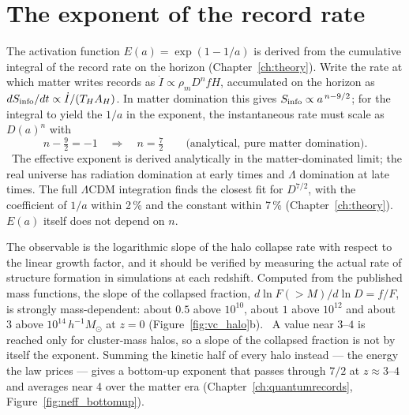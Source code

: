 \section{The exponent of the record rate}\label{sec:vc_exponent}
The activation function $E(a)=\exp(1-1/a)$ is derived from the cumulative integral of the record rate on the horizon (Chapter~\ref{ch:theory}). Write the
rate at which matter writes records as $\dot I\propto\rho_mD^nfH$, accumulated on the horizon as $dS_{\rm info}/dt\propto\dot I/(T_HA_H)$. In matter domination
this gives $S_{\rm info}\propto a^{\,n-9/2}$; for the integral to yield the $1/a$ in the exponent, the instantaneous rate must scale as $D(a)^n$ with
\begin{equation}
n-\tfrac92=-1\quad\Longrightarrow\quad n=\tfrac72\qquad\text{(analytical, pure matter domination).}\label{eq:vc_n}
\end{equation}
\derived\ The effective exponent is derived analytically in the matter-dominated limit; the real universe has radiation domination at early times and
$\Lambda$ domination at late times. The full $\Lambda$CDM integration finds the closest fit for $D^{7/2}$, with the coefficient of $1/a$ within 2\,\% and the constant within 7\,\% (Chapter~\ref{ch:theory}).
\calc\ $E(a)$ itself does not depend on $n$.

The observable is the logarithmic slope of the halo collapse rate with respect to the linear growth factor, and it should be verified by measuring the
actual rate of structure formation in simulations at each redshift. Computed from the published mass functions, the slope of the collapsed fraction,
$d\ln F(>M)/d\ln D=f/F$, is strongly mass-dependent: about $0.5$ above $10^{10}$, about $1$ above $10^{12}$ and about $3$ above
$10^{14}\,h^{-1}M_\odot$ at $z=0$ (Figure~\ref{fig:vc_halo}b). \calc\ A value near $3$--$4$ is reached only for cluster-mass halos, so a slope of the collapsed
fraction is not by itself the exponent. Summing the kinetic half of every halo instead --- the energy the law prices --- gives a bottom-up exponent that
passes through $7/2$ at $z\approx3$--$4$ and averages near 4 over the matter era (Chapter~\ref{ch:quantumrecords}, Figure~\ref{fig:neff_bottomup}). \calc

